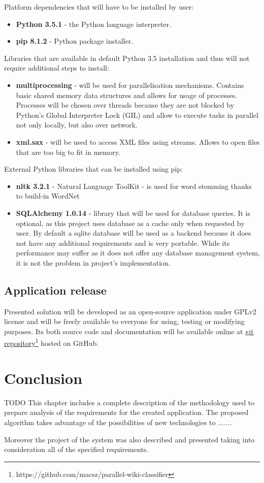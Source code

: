 Platform dependencies that will have to be installed by user:
\begin{itemize}
	\item \textbf{Python 3.5.1} - the Python language interpreter.
	\item\textbf{pip 8.1.2} - Python package installer.
\end{itemize}

Libraries that are available in default Python 3.5 installation and thus will not require additional steps to install:
\begin{itemize}
	\item \textbf{multiprocessing} - will be used for parallelisation mechanisms. Contains basic shared memory data structures and allows for usage of processes. Processes will be chosen over threads because they are not blocked by Python's Global Interpreter Lock (GIL) and allow to execute tasks in parallel not only locally, but also over network.
	\item \textbf{xml.sax} - will be used to access XML files using streams. Allows to open files that are too big to fit in memory.
\end{itemize}

External Python libraries that can be installed using pip:
\begin{itemize}
	\item \textbf{nltk 3.2.1} - Natural Language ToolKit - is used for word stemming thanks to build-in WordNet
	\item \textbf{SQLAlchemy 1.0.14} - library that will be used for database queries. It is optional, as this project uses database as a cache only when requested by user. By default a sqlite database will be used as a backend because it does not have any additional requirements and is very portable. While its performance may suffer as it does not offer any database management system, it is not the problem in project's implementation.
\end{itemize}


\subsection{Application release}
Presented solution will be developed as an open-source application under GPLv2 license and will be freely available to everyone for using, testing or modifying purposes. Its both source code and documentation will be available online at \href{https://github.com/macsz/parallel-wiki-classifier}{git repository\footnote{https://github.com/macsz/parallel-wiki-classifier} hosted on GitHub}.


\section{Conclusion}
TODO
This chapter includes a complete description of the methodology used to prepare analysis of the requirements for the created application. The proposed algorithm takes advantage of the possibilities of new technologies to .......

Moreover the project of the system was also described and presented taking into consideration all of the specified requirements.
